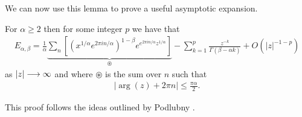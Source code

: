 We can now use this lemma to prove a useful asymptotic expansion.
\begin{lemma}
    For $ \alpha \geq 2 $ then for some integer $ p $ we have that
    \begin{align}
        E_{\alpha, \beta} = \frac{1}{\alpha} \underbrace{\sum_n \left[ \left( x^{1/\alpha} e^{2\pi in / \alpha}\right)^{1-\beta} e^{e^{2 \pi i n / \alpha} z^{1 / \alpha}}\right]}_{\circledast} - \sum_{k=1}^{p} \frac{z^{-k}}{\Gamma(\beta - \alpha k)} + O(|z|^{-1-p})
    \end{align}
    as $ |z| \longrightarrow \infty $ and where $ \circledast $ is the sum over $ n $ such that 
    \begin{align}
        |\arg(z) + 2\pi n| \leq \frac{\pi \alpha}{2}.
    \end{align}
\end{lemma}
This proof follows the ideas outlined by Podlubny \cite{Podlubny1999}.
